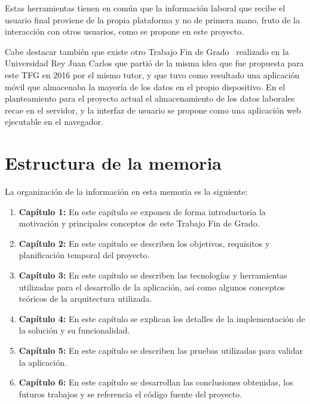 \documentclass[a4paper, 12pt]{book}
\begin{document}
    Estas herramientas tienen en común que la información laboral que recibe el usuario final proviene de la propia plataforma
    y no de primera mano, fruto de la interacción con otros usuarios, como se propone en este proyecto.

    Cabe destacar también que existe otro Trabajo Fin de Grado~\cite{bib:tfg} realizado en la Universidad Rey Juan Carlos que partió
    de la misma idea que fue propuesta para este TFG en 2016 por el mismo tutor, y que tuvo como resultado una aplicación móvil que
    almacenaba la mayoría de los datos en el propio dispositivo. En el planteamiento para el proyecto actual el almacenamiento de los
    datos laborales recae en el servidor, y la interfaz de usuario se propone como una aplicación web ejecutable en el navegador.


    \section{Estructura de la memoria}
    \label{sec:intro_memorystructure}
    La organización de la información en esta memoria es la siguiente:

    \begin{enumerate}
        \item \textbf{Capítulo 1:} En este capítulo se exponen de forma introductoria la motivación y principales conceptos de este Trabajo Fin de Grado.
        \item \textbf{Capítulo 2:} En este capítulo se describen los objetivos, requisitos y planificación temporal del proyecto.
        \item \textbf{Capítulo 3:} En este capítulo se describen las tecnologías y herramientas utilizadas para el desarrollo de la aplicación,
        así como algunos conceptos teóricos de la arquitectura utilizada.
        \item \textbf{Capítulo 4:} En este capítulo se explican los detalles de la implementación de la solución y su funcionalidad.
        \item \textbf{Capítulo 5:} En este capítulo se describen las pruebas utilizadas para validar la aplicación.
        \item \textbf{Capítulo 6:} En este capítulo se desarrollan las conclusiones obtenidas, los futuros trabajos y se referencia
        el código fuente del proyecto.
    \end{enumerate}


\end{document}
